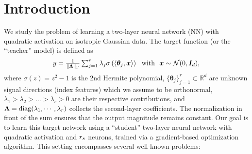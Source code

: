 \section{Introduction} 

We study the problem of learning a two-layer neural network (NN) with quadratic activation on isotropic Gaussian data. The target function (or the ``teacher'' model) is defined as
\begin{equation}\textstyle
y = \frac{1}{\lVert\boldsymbol{\Lambda}\rVert_\text{F}} \sum_{j=1}^{r}
\lambda_j \sigma\left(\langle \boldsymbol{\theta}_j, \boldsymbol{x}\rangle\right)  ~~\text{with}~~  \boldsymbol{x} \sim \mathcal{N}(0,\boldsymbol{I}_d),   \label{eq:target}
\end{equation}
where $\sigma(z) = z^2 - 1$ is the 2nd Hermite polynomial, $\{ \boldsymbol{\theta}_j \}_{j=1}^{r} \subset \mathbb{R}^d$ are unknown signal directions (index features) which we assume to be orthonormal, $\lambda_1 > \lambda_2 > \dots > \lambda_{r} > 0$ are their respective contributions, and $\boldsymbol{\Lambda} = \text{diag}(\lambda_1, \cdots, \lambda_r)$ collects the second-layer coefficients. The normalization in front of the sum ensures that the output magnitude remains constant. 
Our goal is to learn this target network using a ``student'' two-layer neural network with quadratic activation and $r_s$ neurons, trained via a gradient-based optimization algorithm. This setting encompasses several well-known problems:
